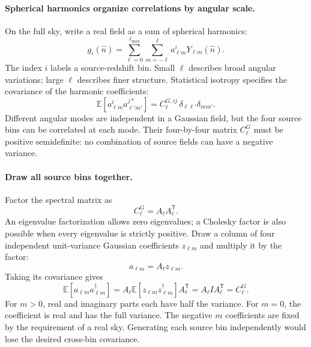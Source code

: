 \documentclass[11pt]{article}
\newcommand{\E}{\mathbb E}
\begin{document}
\paragraph{Spherical harmonics organize correlations by angular scale.}
On the full sky, write a real field as a sum of spherical harmonics:
\begin{equation}
 g_i(\hat n)=\sum_{\ell=0}^{\ell_{\max}}
                   \sum_{m=-\ell}^{\ell} a^i_{\ell m}Y_{\ell m}(\hat n).
\end{equation}
The index $i$ labels a source-redshift bin. Small $\ell$ describes broad
angular variations; large $\ell$ describes finer structure. Statistical
isotropy specifies the covariance of the harmonic coefficients:
\begin{equation}
 \E[a^i_{\ell m}a^{j*}_{\ell' m'}]
       =C^{G,ij}_\ell\,\delta_{\ell\ell'}\delta_{mm'}.
\end{equation}
Different angular modes are independent in a Gaussian field, but the four
source bins can be correlated at each mode. Their four-by-four matrix
$C^G_\ell$ must be positive semidefinite: no combination of source fields
can have a negative variance.

\paragraph{Draw all source bins together.}
Factor the spectral matrix as
\begin{equation}
 C^G_\ell=A_\ell A_\ell^{\mathsf T}.
\end{equation}
An eigenvalue factorization allows zero eigenvalues; a Cholesky factor is
also possible when every eigenvalue is strictly positive. Draw a column
of four independent unit-variance Gaussian coefficients $z_{\ell m}$ and
multiply it by the factor:
\begin{equation}
 a_{\ell m}=A_\ell z_{\ell m}.
\end{equation}
Taking its covariance gives
\begin{equation}
 \E[a_{\ell m}a_{\ell m}^{\dagger}]
 =A_\ell\E[z_{\ell m}z_{\ell m}^{\dagger}]A_\ell^{\mathsf T}
 =A_\ell I A_\ell^{\mathsf T}=C^G_\ell.
\end{equation}
For $m>0$, real and imaginary parts each have half the variance. For
$m=0$, the coefficient is real and has the full variance. The negative
$m$ coefficients are fixed by the requirement of a real sky. Generating
each source bin independently would lose the desired cross-bin covariance.
\end{document}
